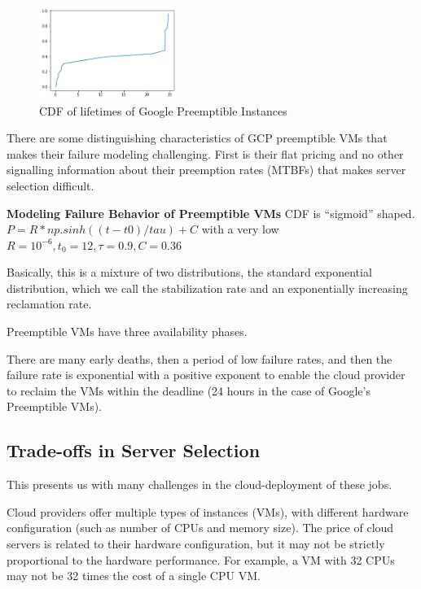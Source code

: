 \begin{figure}
  \centering
  \includegraphics[width=0.4\textwidth]{../data/f20.png}
  \caption{CDF of lifetimes of Google Preemptible Instances }
  \label{fig:gcp1}
\end{figure}

There are some distinguishing characteristics of GCP preemptible VMs that makes their failure modeling challenging.
First is their flat pricing and no other signalling information about their preemption rates (MTBFs) that makes server selection difficult.

\textbf{Modeling Failure Behavior of Preemptible VMs}
CDF is ``sigmoid'' shaped.
$P=R*np.sinh((t-t0)/tau) + C$ with a very low $R=10^{-6}, t_0=12, \tau=0.9, C=0.36$

Basically, this is a mixture of two distributions, the standard exponential distribution, which we call the stabilization rate and an exponentially increasing reclamation rate.

Preemptible VMs have three availability phases.

There are many early deaths, then a period of low failure rates, and then the failure rate is exponential with a positive exponent to enable the cloud provider to reclaim the VMs within the deadline (24 hours in the case of Google's Preemptible VMs).





\subsection{Trade-offs in Server Selection}

This presents us with many challenges in the cloud-deployment of these jobs.

Cloud providers offer multiple types of instances (VMs), with different hardware configuration (such as number of CPUs and memory size).
The price of cloud servers is related to their hardware configuration, but it may not be strictly proportional to the hardware performance.
For example, a VM with 32 CPUs may not be 32 times the cost of a single CPU VM.


